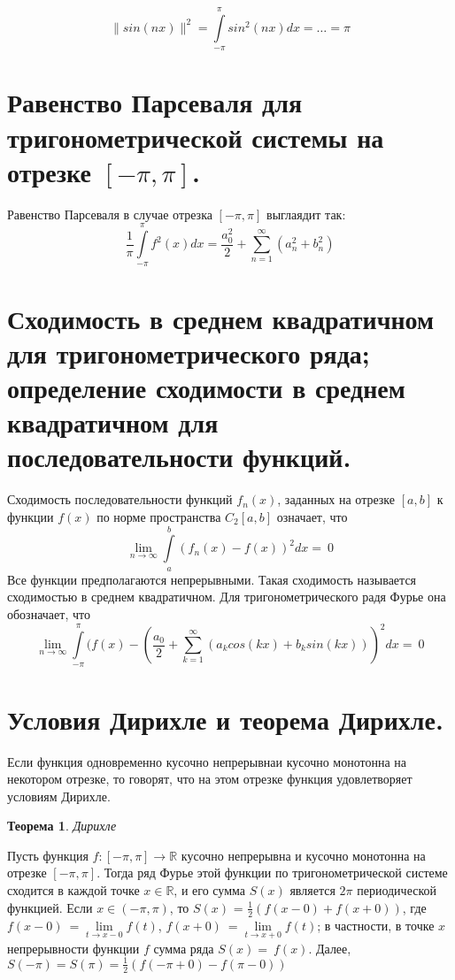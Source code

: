 \documentclass[12pt, a4paper]{article}
\newtheorem{thm}{Теорема}
\begin{document}
$$
    \| sin(nx) \|^2 = \int\limits_{-\pi}^{\pi}sin^2(nx)dx = \ldots = 
    \pi
$$

\section{Равенство Парсеваля для тригонометрической системы на отрезке $[-\pi, \pi]$.}
Равенство Парсеваля в случае отрезка $[-\pi, \pi]$ выглаядит так:
$$
\frac{1}{\pi} \int\limits_{-\pi}^{\pi} f^2(x)dx = \frac{a^2_0}{2} + 
\sum\limits_{n=1}^{\infty}(a^2_n + b^2_n) 
$$

\section{Сходимость в среднем квадратичном для тригонометрического ряда; определение сходимости в среднем квадратичном для последовательности функций.}
Сходимость последовательности функций $f_n(x)$, заданных на отрезке
$[a, b]$ к функции $f(x)$ по норме пространства $C_2[a, b]$ означает,
что 
$$\lim\limits_{n \to \infty}\int\limits_a^b(f_n(x) - f(x))^2dx = \ 0$$
Все функции предполагаются непрерывными. Такая сходимость называется
сходимостью в среднем квадратичном.
\newline
Для тригонометрического радя Фурье она обозначает, что
$$\lim\limits_{n \to \infty}\int\limits_{-\pi}^{\pi}(f(x) - (\frac{a_0}{2} + 
\sum\limits_{k=1}^{\infty}(a_k cos(kx) + b_k sin(kx)) )^2dx = \ 0$$

\section{Условия Дирихле и теорема Дирихле.}
Если функция одновременно кусочно непрерывнаи кусочно монотонна на 
некотором отрезке, то говорят, что на этом отрезке функция удовлетворяет условиям
Дирихле.
\begin{thm}
    Дирихле
\end{thm}
Пусть функция $f: [-\pi, \pi] \to \mathbb{R}$ кусочно непрерывна и кусочно
монотонна на отрезке $[-\pi, \pi]$. Тогда ряд Фурье этой функции по
тригонометрической системе сходится в каждой точке $x \in \mathbb{R}$, и его
сумма $S(x)$ является $2\pi$ периодической функцией.
\newline
Если $x \in (-\pi, \pi)$, то $S(x)$ = $\frac{1}{2}(f(x - 0) + f(x + 0))$,
где $f(x - 0) \ = \lim\limits_{t \to x - 0}f(t)$,
$f(x + 0) \ = \lim\limits_{t \to x + 0}f(t)$; в частности, в точке $x$
непрерывности функции $f$ сумма ряда $S(x) = \ f(x)$. Далее,
$S(-\pi) = S(\pi) = \frac{1}{2}(f(-\pi + 0) - f(\pi - 0))$
\end{document}
